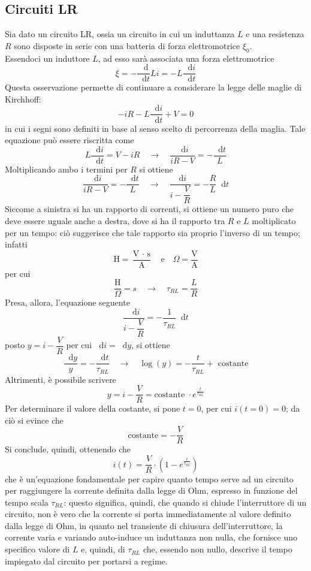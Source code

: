 \documentclass[a4paper]{extarticle}
\newcommand\dif{\mathop{}\!\mathrm{d}}
\begin{document}
\vspace{1em}
\subsection{Circuiti LR}
Sia dato un circuito LR, ossia un circuito in cui un induttanza $L$ e una resistenza $R$ sono disposte in serie con una batteria di forza elettromotrice $\xi_0$.\\
Essendoci un induttore $L$, ad esso sarà associata una forza elettromotrice
\[\xi=-\dfrac{\dif}{\dif t} Li = -L \dfrac{\dif i}{\dif t}\]
Questa osservazione permette di continuare a considerare la legge delle maglie di Kirchhoff:
\[-i R - L \frac{\dif i}{\dif t} + V = 0\]
in cui i segni sono definiti in base al senso scelto di percorrenza della maglia. Tale equazione può essere riscritta come
\[L \frac{\dif i}{\dif t} = V-iR \hspace{1em} \rightarrow \hspace{1em} \dfrac{\dif i}{i R - V} = - \dfrac{\dif t}{L}\]
Moltiplicando ambo i termini per $R$ si ottiene
\[\dfrac{\dif i}{i R - V} = - \dfrac{\dif t}{L} \hspace{1em} \rightarrow \hspace{1em} \dfrac{\dif i}{i - \dfrac{V}{R}} = - \dfrac{R}{L} \dif t\]
Siccome a sinistra si ha un rapporto di correnti, si ottiene un numero puro che deve essere uguale anche a destra, dove si ha il rapporto tra $R$ e $L$ moltiplicato per un tempo: ciò suggerisce che tale rapporto sia proprio l'inverso di un tempo; infatti
\[\text{H} = \dfrac{\text{V } \cdot \text{ s}}{\text{A}}\hspace{1em} \text{e} \hspace{1em} \Omega = \dfrac{\text{V}}{\text{A}}\]
per cui
\[\dfrac{\text{H}}{\Omega} = s \hspace{1em} \rightarrow \hspace{1em} \tau_{RL} = \frac{L}{R}\]
Presa, allora, l'equazione seguente
\[\dfrac{\dif i}{i - \dfrac{V}{R}} = - \dfrac{1}{\tau_{RL}} \dif t\]
posto $y=i-\dfrac{V}{R}$ per cui $\dif i = \dif y$, si ottiene
\[\dfrac{\dif y}{y} = - \dfrac{\dif t}{\tau_{RL}} \hspace{1em} \rightarrow \hspace{1em} \log(y) = - \dfrac{t}{\tau_{RL}} + \text{ costante}\]
Altrimenti, è possibile scrivere
\[y=i-\dfrac{V}{R}=\text{costante } \cdot e^{\frac{t}{\tau_{RL}}}\]
Per determinare il valore della costante, si pone $t=0$, per cui $i(t=0)=0$; da ciò si evince che
\[\text{costante}=-\dfrac{V}{R}\]
Si conclude, quindi, ottenendo che
\[\boxed{i(t)=\dfrac{V}{R} \cdot \left(1-e^{\frac{t}{\tau_{RL}}}\right)}\]
che è un'equazione fondamentale per capire quanto tempo serve ad un circuito per raggiungere la corrente definita dalla legge di Ohm, espresso in funzione del tempo scala $\tau_{RL}$: questo significa, quindi, che quando si chiude l'interruttore di un circuito, non è vero che la corrente si porta immediatamente al valore definito dalla legge di Ohm, in quanto nel transiente di chiusura dell'interruttore, la corrente varia e variando auto-induce un induttanza non nulla, che fornisce uno specifico valore di $L$ e, quindi, di $\tau_{RL}$ che, essendo non nullo, descrive il tempo impiegato dal circuito per portarsi a regime.
\end{document}
